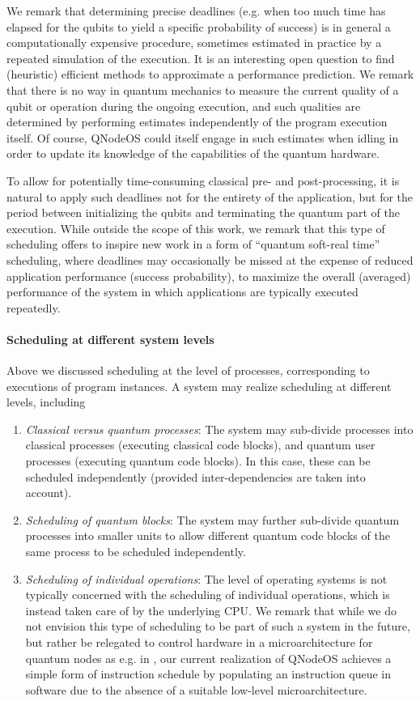 We remark that determining precise deadlines (e.g. when too much time has elapsed for the qubits to yield a specific probability of success) is in general a computationally expensive procedure, sometimes estimated in practice by a repeated simulation of the execution. It is an interesting open question to find (heuristic) efficient methods to approximate a performance prediction. We remark that there is no way in quantum mechanics to measure the current quality of a qubit or operation during the ongoing execution, and such qualities are determined by performing estimates independently of the program execution itself. Of course, \ac{QNodeOS} could itself engage in such estimates when idling in order to update its knowledge of the capabilities of the quantum hardware.

To allow for potentially time-consuming classical pre- and post-processing, it is natural to apply such deadlines not for the entirety of the application, but for the period between initializing the qubits and terminating the quantum part of the execution. While outside the scope of this work, we remark that this type of scheduling offers to inspire new work in a form of ``quantum soft-real time'' scheduling, where deadlines may occasionally be missed at the expense of reduced application performance (success probability), to maximize the overall (averaged) performance of the system in which
applications are typically executed repeatedly. 

\paragraph{Scheduling at different system levels}

Above we discussed scheduling at the level of processes, corresponding to executions of program instances. A system may realize scheduling at different levels, including
%
\begin{enumerate}
\item \emph{Classical versus quantum processes}: The system may sub-divide processes into classical processes (executing classical code blocks), and quantum user processes (executing quantum code blocks). In this case, these can be scheduled independently (provided inter-dependencies are taken into account). 
\item \emph{Scheduling of quantum blocks}: The system may further sub-divide quantum processes into smaller units to allow different quantum code blocks of the same process to be scheduled independently.
\item \emph{Scheduling of individual operations}: The level of operating systems is not typically concerned with the scheduling of individual operations, which is instead taken care of by the underlying \ac{CPU}. We remark that while we do not envision this type of scheduling to be part of such a system in the future, but rather be relegated to control hardware in a microarchitecture for quantum nodes as e.g. in 
\textcite{fu_2017_microarch}, our current realization of \ac{QNodeOS} achieves a simple form of instruction schedule by populating an instruction queue in software due to the absence of a suitable low-level microarchitecture.
\end{enumerate}